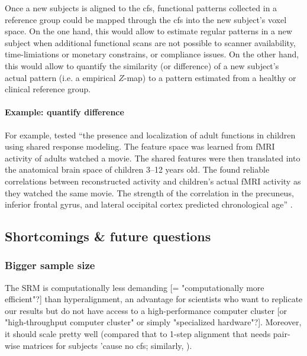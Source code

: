 %
Once a new subjects is aligned to the \ac{cfs}, functional patterns collected in
a reference group could be mapped through the \ac{cfs} into the new subject's
voxel space.
%
On the one hand, this would allow to estimate regular patterns in a new subject
when additional functional scans are not possible to scanner availability,
time-limiations or monetary constrains, or compliance issues.
%
On the other hand, this would allow to quantify the similarity (or difference)
of a new subject's actual pattern (i.e. a empirical $Z$-map) to a pattern
estimated from a healthy or clinical reference group.


\paragraph{Example: \citet{yates2021emergence} quantify difference}


For example, \citet{yates2021emergence} tested ``the presence and localization
of adult functions in children using shared response modeling.
%
The feature space was learned from fMRI activity of adults watched a movie.
%
The shared features were then translated into the anatomical brain space of
children 3--12 years old.
%
The found reliable correlations between reconstructed activity and children's
actual fMRI activity as they watched the same movie.
%
The strength of the correlation in the precuneus, inferior frontal gyrus, and
lateral occipital cortex predicted chronological age''
\citep{yates2021emergence}.



\subsection{Shortcomings \& future questions}

\subsubsection{Bigger sample size}
%
The SRM is computationally less demanding [= "computationally more efficient"?]
than hyperalignment, an advantage for scientists who want to replicate our
results but do not have access to a high-performance computer cluster [or
"high-throughput computer cluster" or simply "specialized hardware"?].
%
Moreover, it should scale pretty well (compared that to
\citep{jiahui2020predicting, jiahui2022cross} 1-step alignment that needs
pair-wise matrices for subjects 'cause no \ac{cfs}; similarly,
\citep{busch2021hybrid}).


